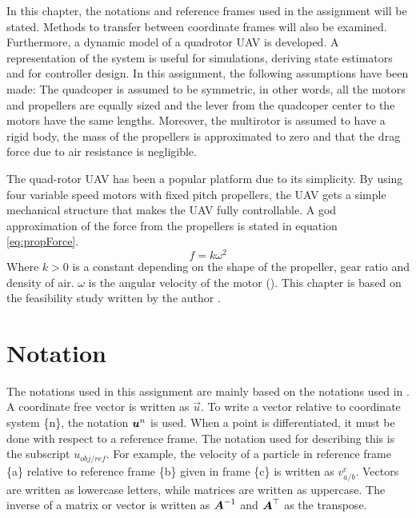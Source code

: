 In this chapter, the notations and reference frames used in the assignment will be stated. Methods to transfer between coordinate frames will also be examined. Furthermore, a dynamic model of a quadrotor UAV is developed. A representation of the system is useful for simulations, deriving state estimators and for controller design. In this assignment, the following assumptions have been made: The quadcoper is assumed to be symmetric, in other words, all the motors and propellers are equally sized and the lever from the quadcoper center to the motors have the same lengths. Moreover, the multirotor is assumed to have a rigid body, the mass of the propellers is approximated to zero and that the drag force due to air resistance is negligible.

The quad-rotor UAV has been a popular platform due to its simplicity. By using four variable speed motors with fixed pitch propellers, the UAV gets a simple mechanical structure that makes the UAV fully controllable. A god approximation of the force from the propellers is stated in equation \ref{eq:propForce}.
\begin{equation}\label{eq:propForce}
  f=k\omega^{2}
\end{equation}
Where $k>0$ is a constant depending on the shape of the propeller, gear ratio and density of air. $\omega$ is the angular velocity of the motor (\cite{lozano2013unmanned}). This chapter is based on the feasibility study written by the author \citep{Line2017}.

\section{Notation}\label{sec:notation}
The notations used in this assignment are mainly based on the notations used in \cite{Fossen2011}. A coordinate free vector is written as $\vec{u}$. To write a vector relative to coordinate system \{n\}, the notation $\boldsymbol{u}^{n}$ is used. When a point is differentiated, it must be done with respect to a reference frame. The notation used for describing this is the subscript $u_{obj/ref}$. For example, the velocity of a particle in reference frame \{a\} relative to reference frame \{b\} given in frame \{c\} is written as $v^{c}_{a/b}$. Vectors are written as lowercase letters, while matrices are written as uppercase. The inverse of a matrix or vector is written as $\boldsymbol{A}^{-1}$ and $\boldsymbol{A}^\top$ as the transpose.

